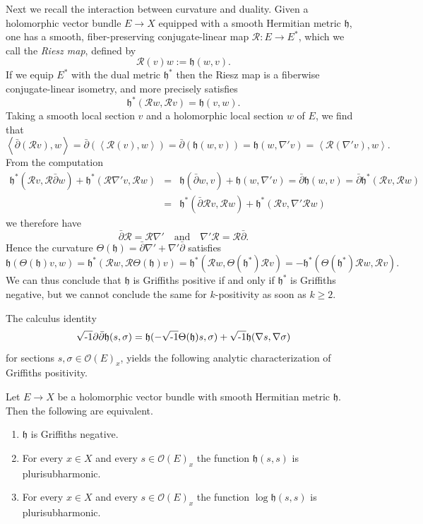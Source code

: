 \documentclass[12pt,hidelinks]{amsart}
\newcommand{\cO}{{\mathcal O}}
\newcommand{\sR}{{\mathscr R}}
\newcommand{\fh}{{\mathfrak h}}
\newcommand{\di}{\partial}
\newcommand{\dbar}{\bar \partial}
\newcommand{\ii}{\sqrt{\text{\rm -}1}}
\begin{document}
Next we recall the interaction between curvature and duality.  Given a holomorphic vector bundle $E \to X$ equipped with a smooth Hermitian metric $\fh$, one has a smooth, fiber-preserving conjugate-linear map $\sR : E \to E^*$, which we call the \emph{Riesz map}, defined by 
\[
\sR (v) w := \fh (w,v).
\]
If we equip $E^*$ with the dual metric $\fh ^*$ then the Riesz map is a fiberwise conjugate-linear isometry, and more precisely satisfies 
\[
\fh ^* (\sR w,\sR v) = \fh (v,w).
\]
Taking a smooth local section $v$ and a holomorphic local section $w$ of $E$, we find that 
\[
\left < \dbar (\sR v),  w\right > = \dbar (\left < \sR (v), w\right > ) = \dbar (\fh (w,v)) = \fh (w, \nabla 'v) = \left < \sR (\nabla ' v), w\right >.
\]
From the computation
\begin{eqnarray*}
\fh ^* (\sR v, \sR \dbar w) + \fh ^*(\sR \nabla 'v, \sR w) &=& \fh (\dbar w, v) + \fh(w, \nabla 'v) =  \dbar \fh (w,v) = \dbar \fh^* (\sR v, \sR w) \\
&=& \fh ^*(\dbar \sR v, \sR w) + \fh ^*(\sR v, \nabla ' \sR w)
\end{eqnarray*}
we therefore have 
\[
\dbar \sR = \sR \nabla ' \quad \text{and} \quad \nabla ' \sR = \sR \dbar.
\]
Hence the curvature $\Theta (\fh) = \dbar \nabla ' + \nabla ' \dbar$ satisfies 
\begin{equation}\label{dual-curvatures-eqn}
\fh (\Theta (\fh) v,w) = \fh ^* (\sR w, \sR \Theta (\fh)v) = \fh ^* (\sR w, \Theta (\fh ^*) \sR v) = -  \fh ^* (\Theta (\fh ^*) \sR w, \sR v).
\end{equation}
We can thus conclude that $\fh$ is Griffiths positive if and only if $\fh ^*$ is Griffiths negative, but we cannot conclude the same for $k$-positivity as soon as $k \ge 2$.

The calculus identity 
\begin{equation}\label{bo-calculation}
\ii \di \dbar \fh (s, \sigma) = \fh (- \ii \Theta (\fh) s, \sigma) + \ii \fh (\nabla s, \nabla \sigma)
\end{equation}
for sections $s, \sigma \in \cO(E)_x$, yields the following analytic characterization of Griffiths positivity.  

\begin{prop}\label{griffiths-test-holo}
Let $E \to X$ be a holomorphic vector bundle with smooth Hermitian metric $\fh$.  Then the following are equivalent.
\begin{enumerate}[{\rm a.}]
\item $\fh$ is Griffiths negative.
\item For every $x \in X$ and every $s \in \cO (E)_x$ the function $\fh (s,s)$ is plurisubharmonic.
\item For every $x \in X$ and every $s \in \cO (E)_x$ the function $\log \fh (s,s)$ is plurisubharmonic.
\end{enumerate}
\end{prop}
\end{document}
